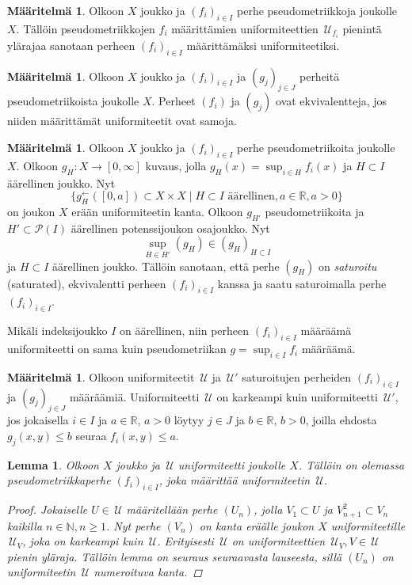 \documentclass[12pt,a4paper,leqno]{report}
\newcommand{\R}{\mathbb{R}}
\newcommand{\N}{\mathbb{N}}
\newcommand{\U}{\,\mathcal{U}}
\newcommand{\Pot}{\mathcal{P}}
\theoremstyle{plain}
\newtheorem{lem}[equation]{Lemma}
\theoremstyle{definition}
\newtheorem{maar}[equation]{Määritelmä}
\newtheorem{esim}[equation]{Esimerkki}
\theoremstyle{remark}
\begin{document}
\begin{maar}
Olkoon $X$ joukko ja $(f_i)_{i\in I} $ perhe pseudometriikkoja joukolle $X$. 
Tällöin pseudometriikkojen $f_i$ määrittämien uniformiteettien $\U_{f_i}$ pienintä ylärajaa sanotaan perheen $(f_i)_{i\in I}$ määrittämäksi uniformiteetiksi. 
\end{maar}
\begin{maar}
Olkoon $X$ joukko ja $(f_i)_{i\in I} $ ja $(g_j)_{j\in J} $ perheitä pseudometriikoista joukolle $X$. 
Perheet $(f_i)$ ja $(g_j) $ ovat ekvivalentteja, jos niiden määrittämät uniformiteetit ovat samoja.
\end{maar}
\begin{maar}
Olkoon $X$ joukko ja $(f_i)_{i\in I} $ perhe pseudometriikoita joukolle $X$. 
Olkoon $g_{H}\colon X\rightarrow [0,\infty]$ kuvaus, 
jolla $g_{H}(x)=\sup_{i\in H}f_i(x)$ ja $H\subset I$ äärellinen joukko.
Nyt 
$$\{g_{H}^\leftarrow ([0,a])\subset X\times X\mid H\subset I \text{ äärellinen}, a\in\R , a>0 \}$$
on joukon $X$ erään uniformiteetin kanta. 
Olkoon $g_{H'}$ pseudometriikoita ja $H'\subset\Pot(I)$ äärellinen potenssijoukon osajoukko. 
Nyt 
$$\sup_{H\in H'}(g_H)\in (g_H)_{H\subset I} $$ 
ja $H\subset I$ äärellinen joukko.
Tällöin sanotaan, että perhe $(g_H)$ on \emph{saturoitu} (saturated), 
ekvivalentti perheen $(f_i)_{i\in I}$ kanssa 
ja saatu saturoimalla perhe $(f_i)_{i\in I}$. 

Mikäli indeksijoukko $I$ on äärellinen, niin perheen $(f_i)_{i\in I}$ määräämä 
uniformiteetti on sama kuin pseudometriikan $g=\sup_{i\in I} f_i$ määräämä.
\end{maar}
\begin{maar}
Olkoon uniformiteetit $\U$ ja $\U'$ saturoitujen perheiden 
$(f_i)_{i\in I}$ ja $(g_j)_{j\in J}$ määräämiä. 
Uniformiteetti $\U$ on karkeampi kuin uniformiteetti $\U'$, 
jos jokaisella $i\in I$ ja $a\in\R$, $a>0$ löytyy $j\in J$ ja $b\in\R$, $b>0$, 
joilla ehdosta $g_j(x,y)\leq b$ seuraa $f_i(x,y)\leq a$.
\end{maar}
\begin{lem}\label{pseudo_uniformista}
Olkoon $X$ joukko ja $\U$ uniformiteetti joukolle $X$. 
Tällöin on olemassa pseudometriikkaperhe $(f_i)_{i\in I}$, joka määrittää uniformiteetin $\U$.
\begin{proof}
Jokaiselle $U\in\U$ määritellään perhe $(U_n)$, 
jolla $V_1\subset U$ ja $V_{n+1}^2\subset V_n$ kaikilla $n\in\N, n\geq 1$. 
Nyt perhe $(V_n)$ on kanta eräälle joukon $X$ uniformiteetille $\U_V$, 
joka on karkeampi kuin $\U$. 
Erityisesti $\U$ on uniformiteettien 
$\U_V,V\in\U$ pienin yläraja. %
Tällöin lemma on seuraus seuraavasta lauseesta, sillä 
$(U_n)$ on uniformiteetin $\U$ numeroituva kanta.
\end{proof}
\end{lem}
\end{document}
